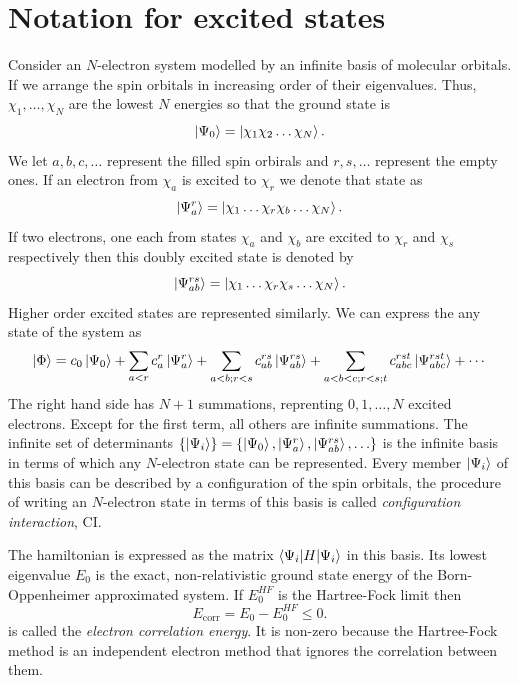 \section{Notation  for excited states}\label{c2s7}
Consider an $N$-electron system modelled by an infinite basis of molecular
orbitals. If we arrange the spin orbitals in increasing order of their 
eigenvalues. Thus, $\chi_1, \ldots, \chi_N$ are the lowest $N$ energies so that 
the ground state is
\begin{equation}\label{c2e58}
\ket{\Psi_0} = \ket{\chi_1\chi_2\ldots\chi_N}.
\end{equation}
We let $a, b, c, \ldots$ represent the filled spin orbirals and $r, s, \ldots$
represent the empty ones. If an electron from $\chi_a$ is excited to $\chi_r$
we denote that state as
\begin{equation}\label{c2e59}
\ket{\Psi_a^r} = \ket{\chi_1\ldots\chi_r\chi_b\ldots\chi_N}.
\end{equation}
If two electrons, one each from states $\chi_a$ and $\chi_b$ are excited to
$\chi_r$ and $\chi_s$ respectively then this doubly excited state is denoted by
\begin{equation}\label{c2e60}
\ket{\Psi_{ab}^{rs}} = \ket{\chi_1\ldots\chi_r\chi_s\ldots\chi_N}.
\end{equation}
Higher order excited states are represented similarly. We can express the any
state of the system as
\begin{equation}\label{c2e61}
\ket{\Phi} = c_0\ket{\Psi_0} + \sum_{a<r}c_a^r\ket{\Psi_a^r} +
\sum_{a<b;r<s}c_{ab}^{rs}\ket{\Psi_{ab}^{rs}} +
\sum_{a<b<c;r<s;t}c_{abc}^{rst}\ket{\Psi_{abc}^{rst}} + \cdots
\end{equation}
The right hand side has $N + 1$ summations, reprenting $0, 1, \ldots, N$
excited electrons. Except for the first term, all others are infinite summations.
The infinite set of determinants $\{\ket{\Psi_i}\} = \{\ket{\Psi_0}, 
\ket{\Psi_a^r}, \ket{\Psi_{ab}^{rs}}, \ldots\}$ is the infinite basis in terms 
of which any $N$-electron state can be represented. Every member $\ket{\Psi_i}$
of this basis can be described by a configuration of the spin orbitals, the
procedure of writing an $N$-electron state in terms of this basis is called
\emph{configuration interaction}, CI.

The hamiltonian is expressed as the matrix $\braket{\Psi_i|H|\Psi_i}$ in this
basis. Its lowest eigenvalue $E_0$ is the exact, non-relativistic ground
state energy of the Born-Oppenheimer approximated system. If $E_0^{HF}$ is the
Hartree-Fock limit then
\begin{equation}\label{c2e62}
E_\text{corr} = E_0 - E_0^{HF} \le 0.
\end{equation}
is called the \emph{electron correlation energy}. It is non-zero because the
Hartree-Fock method is an independent electron method that ignores the 
correlation between them.

